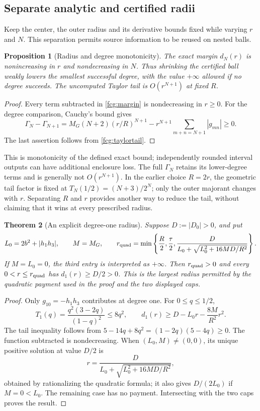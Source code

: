 \documentclass[11pt]{article}
\numberwithin{equation}{section}
\newtheorem{theorem}{Theorem}[section]
\newtheorem{proposition}[theorem]{Proposition}
\begin{document}
\subsection{Separate analytic and certified radii}

Keep the center, the outer radius and its derivative bounds fixed while
varying $r$ and $N$. This separation permits source information to be
reused on nested balls.

\begin{proposition}[Radius and degree monotonicity]
\label{fcg:monotonicity}
The exact margin $d_N(r)$ is nonincreasing in $r$ and nondecreasing
in $N$. Thus shrinking the certified ball weakly lowers the smallest
successful degree, with the value $+\infty$ allowed if no degree
succeeds. The uncomputed Taylor tail is $O(r^{N+1})$ at fixed $R$.
\end{proposition}
\begin{proof}
Every term subtracted in \eqref{fcg:margin} is nondecreasing in
$r\ge0$. For the degree comparison, Cauchy's bound gives
\[
 \Gamma_N-\Gamma_{N+1}
 =M_G(N+2)(r/R)^{N+1}
       -r^{N+1}\sum_{m+n=N+1}|g_{mn}|\ge0.
\]
The last assertion follows from \eqref{fcg:taylortail}.
\end{proof}

This is monotonicity of the defined exact bound; independently rounded
interval outputs can have additional enclosure loss. The full
$\Gamma_N$ retains its lower-degree terms and is generally not
$O(r^{N+1})$. In the earlier choice $R=2r$, the geometric tail factor
is fixed at $T_N(1/2)=(N+3)/2^N$; only the outer majorant changes
with $r$. Separating $R$ and $r$ provides another way to reduce the
tail, without claiming that it wins at every prescribed radius.

\begin{theorem}[An explicit degree-one radius]
\label{fcg:radius}
Suppose $D:=|D_0|>0$, and put
\[
 L_0=2b^2+|h_1h_3|,\qquad M=M_G,\qquad
 r_{\rm quad}=\min\left\{\frac R2,\frac\tau2,
 \frac{D}{L_0+\sqrt{L_0^2+16MD/R^2}}\right\}.
\]
If $M=L_0=0$, the third entry is interpreted as $+\infty$.
Then $r_{\rm quad}>0$ and every $0<r\le r_{\rm quad}$ has
$d_1(r)\ge D/2>0$. This is the largest radius permitted by the
quadratic payment used in the proof and the two displayed caps.
\end{theorem}
\begin{proof}
Only $g_{10}=-h_1h_3$ contributes at degree one. For $0\le q\le1/2$,
\[
 T_1(q)=\frac{q^2(3-2q)}{(1-q)^2}\le8q^2,\qquad
 d_1(r)\ge D-L_0r-\frac{8M}{R^2}r^2.
\]
The tail inequality follows from $5-14q+8q^2=(1-2q)(5-4q)\ge0$.
The function subtracted is nondecreasing. When $(L_0,M)\ne(0,0)$,
its unique positive solution at value $D/2$ is
\[
 r=\frac{D}{L_0+\sqrt{L_0^2+16MD/R^2}},
\]
obtained by rationalizing the quadratic formula; it also gives
$D/(2L_0)$ if $M=0<L_0$. The remaining case has no payment.
Intersecting with the two caps proves the result.
\end{proof}
\end{document}
